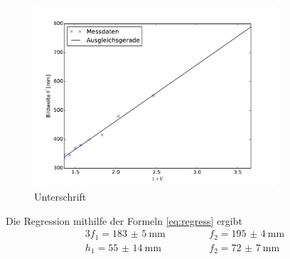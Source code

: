 \begin{figure}[t]
	\centering
	\includegraphics[width=0.8\textwidth]{Bilder/Abbe2.pdf}
	\caption{Unterschrift}
	\label{fig:abbe3}
\end{figure}

Die Regression mithilfe der Formeln \ref{eq:regress}
ergibt 
\begin{alignat}{3}
	f_1 = \SI{183(5)}{\milli\meter} & \qquad&&f_2 = \SI{195(4)}{\milli\meter} \\
	h_1 = \SI{55(14)}{\milli\meter} & \qquad&&f_2 = \SI{72(7)}{\milli\meter}
\end{alignat}
